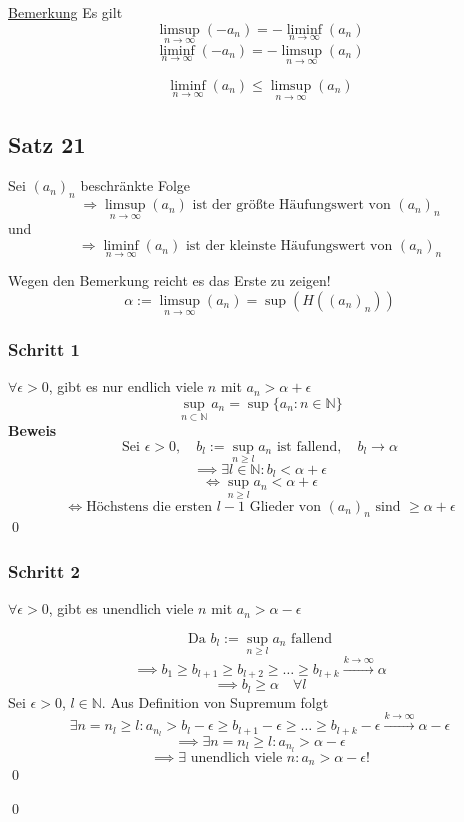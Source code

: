 \documentclass[fleqn]{scrbook}
\renewenvironment{proof}{{\bfseries Beweis }}{\qed}
\begin{document}
\underline{Bemerkung} Es gilt
\[\limsup_{n \to \infty} (-a_n) = - \liminf_{n \to \infty}(a_n) \]
\[\liminf_{n \to \infty} (-a_n) = - \limsup_{n \to \infty}(a_n) \]

\[\liminf_{n \to \infty} (a_n) \leq \limsup_{n \to \infty} (a_n)\]

\subsection{Satz 21}

Sei $(a_n)_n$ beschränkte Folge
\[\Longrightarrow \limsup_{n \to \infty} (a_n) \text{ ist der größte Häufungswert von } (a_n)_n\]
und
\[\Longrightarrow \liminf_{n \to \infty} (a_n) \text{ ist der kleinste Häufungswert von } (a_n)_n\]

\begin{proof}

Wegen den Bemerkung reicht es das Erste zu zeigen!
\[\alpha := \limsup_{n \to \infty} (a_n)=\sup(H((a_n)_n))\]

\subsubsection{Schritt 1}
$\forall \epsilon > 0$, gibt es nur endlich viele $n$ mit $a_n> \alpha + \epsilon$
\[\sup_{n \subset \mathbb{N}} a_n = \sup\{a_n:n \in \mathbb{N}\}\]
\begin{proof}
  \[ \text{Sei } \epsilon>0,\quad b_l := \sup_{n \geq l} a_n \text{ ist fallend},\quad b_l \to \alpha\]
  \[\implies \exists l \in \mathbb{N}: b_l < \alpha + \epsilon\]
  \[\Longleftrightarrow \sup_{n \geq l} a_n < \alpha + \epsilon\]
  \[\Longleftrightarrow \text{Höchstens die ersten } l-1 \text{ Glieder von } (a_n)_n \text{ sind } \geq \alpha + \epsilon \]
\end{proof}

\subsubsection{Schritt 2}
$\forall \epsilon > 0$, gibt es unendlich viele $n$ mit $a_n> \alpha - \epsilon$

\begin{proof}
\[\text{Da } b_l:= \sup_{n \geq l} a_n \text{ fallend}\]
\[\implies b_1 \geq b_{l+1} \geq b_{l+2} \geq \ldots \geq b_{l+k} \stackrel{k\to \infty}{\to} \alpha\]
\[\implies b_l \geq \alpha \quad \forall l\]
Sei $\epsilon >0$, $l\in \mathbb{N}$. Aus Definition von Supremum folgt
\[\exists n = n_l \geq l: a_{n_l}>b_l-\epsilon \geq b_{l+1}-\epsilon \geq \ldots \geq b_{l+k}-\epsilon \stackrel{k\to \infty}{\to} \alpha -\epsilon\]
\[\implies \exists n = n_l \geq l: a_{n_l}>\alpha-\epsilon \]
\[\implies \exists \text{ unendlich viele } n: a_n > \alpha - \epsilon!\]
\end{proof}

\end{proof}
\end{document}
